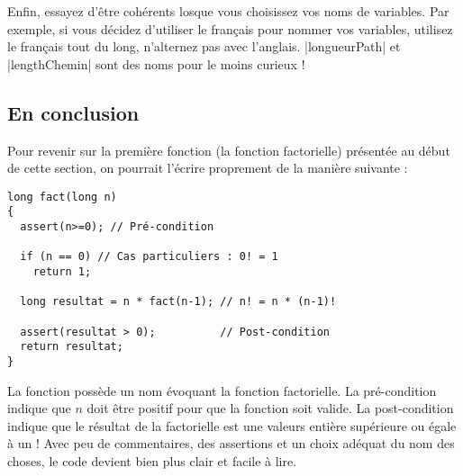 Enfin, essayez d'être cohérents losque vous choisissez vos noms de variables. Par exemple, si vous décidez d'utiliser
le français pour nommer vos variables, utilisez le français tout du long, n'alternez pas avec l'anglais.
|longueurPath| et |lengthChemin| sont des noms pour le moins curieux !

\subsection{En conclusion}

Pour revenir sur la première fonction (la fonction factorielle) présentée au début de cette section, on pourrait l'écrire
proprement de la manière suivante :

\begin{lstlisting}
long fact(long n)
{
  assert(n>=0); // Pré-condition

  if (n == 0) // Cas particuliers : 0! = 1
    return 1;

  long resultat = n * fact(n-1); // n! = n * (n-1)!

  assert(resultat > 0);          // Post-condition
  return resultat;
}
\end{lstlisting}

La fonction possède un nom évoquant la fonction factorielle. La pré-condition indique que $n$ doit être positif pour que la fonction soit valide. La post-condition indique que le résultat de la factorielle est une valeurs entière supérieure ou égale à un ! Avec peu de commentaires, des assertions et un choix adéquat du nom des choses, le code devient bien plus clair et facile à lire.




